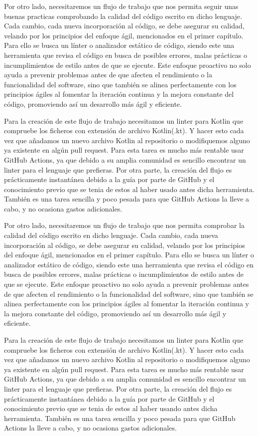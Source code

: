 Por otro lado, necesitaremos un flujo de trabajo que nos permita seguir unas buenas practicas comprobando
la calidad del código escrito en dicho lenguaje. Cada cambio, cada nueva incorporación al código, se debe asegurar su 
calidad, velando por los principios del enfoque ágil, mencionados en el primer capítulo. Para ello se busca un línter 
o analizador estático de código, siendo este una herramienta que revisa el código en busca de posibles 
errores, malas prácticas o incumplimientos de estilo antes de que se ejecute. Este enfoque proactivo no solo 
ayuda a prevenir problemas antes de que afecten el rendimiento o la funcionalidad del software, sino que 
también se alinea perfectamente con los principios ágiles al fomentar la iteración continua y la mejora 
constante del código, promoviendo así un desarrollo más ágil y eficiente. 

Para la creación de este flujo de trabajo necesitamos un linter para Kotlin que compruebe los ficheros con 
extensión de archivo Kotlin(.kt). Y hacer esto cada vez que añadamos un nuevo archivo Kotlin al repositorio 
o modifiquemos alguno ya existente en algún pull request. Para esta tarea es mucho más rentable usar GitHub 
Actions, ya que debido a su amplia comunidad es sencillo encontrar un linter para el lenguaje que prefieras. 
Por otra parte, la creación del flujo es prácticamente instantánea debido a la guía por parte de GitHub y el conocimiento previo que se tenia de estos al haber usado antes dicha herramienta. 
También es una tarea sencilla y poco pesada para que GitHub Actions la lleve a cabo, y no ocasiona gastos 
adicionales.

Por otro lado, necesitaremos un flujo de trabajo que nos permita comprobar la calidad del código escrito en 
dicho lenguaje. Cada cambio, cada nueva incorporación al código, se debe asegurar su calidad, velando por 
los principios del enfoque ágil, mencionados en el primer capítulo. Para ello se busca un línter o 
analizador estático de código, siendo este una herramienta que revisa el código en busca de posibles 
errores, malas prácticas o incumplimientos de estilo antes de que se ejecute. Este enfoque proactivo no solo 
ayuda a prevenir problemas antes de que afecten el rendimiento o la funcionalidad del software, sino que 
también se alinea perfectamente con los principios ágiles al fomentar la iteración continua y la mejora 
constante del código, promoviendo así un desarrollo más ágil y eficiente. 

Para la creación de este flujo de trabajo necesitamos un linter para Kotlin que compruebe los ficheros con 
extensión de archivo Kotlin(.kt). Y hacer esto cada vez que añadamos un nuevo archivo Kotlin al repositorio 
o modifiquemos alguno ya existente en algún pull request. Para esta tarea es mucho más rentable usar GitHub 
Actions, ya que debido a su amplia comunidad es sencillo encontrar un linter para el lenguaje que prefieras. 
Por otra parte, la creación del flujo es prácticamente instantánea debido a la guía por parte de GitHub y el conocimiento previo que se tenia de estos al haber usando antes dicha herramienta. 
También es una tarea sencilla y poco pesada para que GitHub Actions la lleve a cabo, y no ocasiona gastos 
adicionales.

